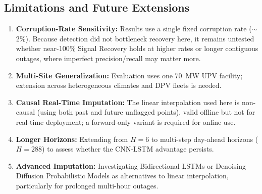 \documentclass[conference]{IEEEtran}
\begin{document}
\subsection*{Limitations and Future Extensions}
\begin{enumerate}
    \item \textbf{Corruption-Rate Sensitivity:} Results use a single fixed corruption rate ($\sim$2\%). Because detection did not bottleneck recovery here, it remains untested whether near-100\% Signal Recovery holds at higher rates or longer contiguous outages, where imperfect precision/recall may matter more.
    \item \textbf{Multi-Site Generalization:} Evaluation uses one 70~MW UPV facility; extension across heterogeneous climates and DPV fleets is needed.
    \item \textbf{Causal Real-Time Imputation:} The linear interpolation used here is non-causal (using both past and future unflagged points), valid offline but not for real-time deployment; a forward-only variant is required for online use.
    \item \textbf{Longer Horizons:} Extending from $H=6$ to multi-step day-ahead horizons ($H=288$) to assess whether the CNN-LSTM advantage persists.
    \item \textbf{Advanced Imputation:} Investigating Bidirectional LSTMs or Denoising Diffusion Probabilistic Models as alternatives to linear interpolation, particularly for prolonged multi-hour outages.
\end{enumerate}
\end{document}
